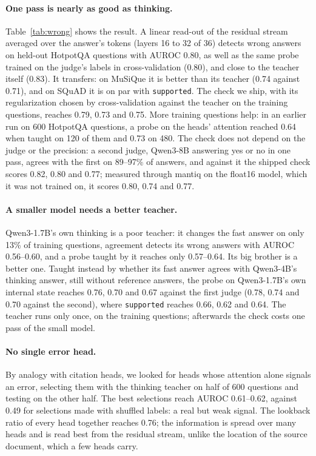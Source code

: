 \documentclass[11pt]{article}
\begin{document}
\paragraph{One pass is nearly as good as thinking.} Table~\ref{tab:wrong} shows the result. A linear read-out of the residual stream averaged over the answer's tokens (layers 16 to 32 of 36) detects wrong answers on held-out HotpotQA questions with AUROC 0.80, as well as the same probe trained on the judge's labels in cross-validation (0.80), and close to the teacher itself (0.83). It transfers: on MuSiQue it is better than its teacher (0.74 against 0.71), and on SQuAD it is on par with \texttt{supported}. The check we ship, with its regularization chosen by cross-validation against the teacher on the training questions, reaches 0.79, 0.73 and 0.75. More training questions help: in an earlier run on 600 HotpotQA questions, a probe on the heads' attention reached 0.64 when taught on 120 of them and 0.73 on 480. The check does not depend on the judge or the precision: a second judge, Qwen3-8B answering yes or no in one pass, agrees with the first on 89--97\% of answers, and against it the shipped check scores 0.82, 0.80 and 0.77; measured through mantiq on the float16 model, which it was not trained on, it scores 0.80, 0.74 and 0.77.

\paragraph{A smaller model needs a better teacher.} Qwen3-1.7B's own thinking is a poor teacher: it changes the fast answer on only 13\% of training questions, agreement detects its wrong answers with AUROC 0.56--0.60, and a probe taught by it reaches only 0.57--0.64. Its big brother is a better one. Taught instead by whether its fast answer agrees with Qwen3-4B's thinking answer, still without reference answers, the probe on Qwen3-1.7B's own internal state reaches 0.76, 0.70 and 0.67 against the first judge (0.78, 0.74 and 0.70 against the second), where \texttt{supported} reaches 0.66, 0.62 and 0.64. The teacher runs only once, on the training questions; afterwards the check costs one pass of the small model.

\paragraph{No single error head.} By analogy with citation heads, we looked for heads whose attention alone signals an error, selecting them with the thinking teacher on half of 600 questions and testing on the other half. The best selections reach AUROC 0.61--0.62, against 0.49 for selections made with shuffled labels: a real but weak signal. The lookback ratio of every head together reaches 0.76; the information is spread over many heads and is read best from the residual stream, unlike the location of the source document, which a few heads carry.
\end{document}
